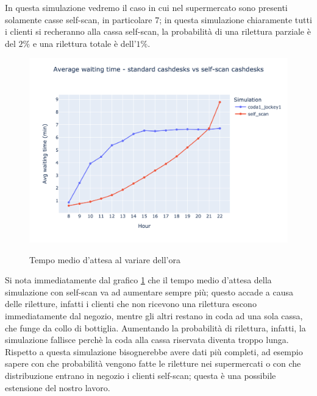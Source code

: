 In questa simulazione vedremo il caso in cui nel supermercato sono presenti solamente casse self-scan, in particolare 7; in questa simulazione chiaramente tutti i clienti si recheranno alla cassa self-scan, la probabilità di una rilettura parziale è del $2\%$ e una rilettura totale è dell'$1\%$.

\begin{figure}[H]
	\centering
	\includegraphics[width=12cm]{"images/results/avg_wt_selfscan.png"}
	\label{fig:avg_wt_selfscan}
	\caption{Tempo medio d'attesa al variare dell'ora}
\end{figure}

Si nota immediatamente dal grafico \ref{fig:avg_wt_selfscan} che il tempo medio d'attesa della simulazione con self-scan va ad aumentare sempre più; questo accade a causa delle riletture, infatti i clienti che non ricevono una rilettura escono immediatamente dal negozio, mentre gli altri restano in coda ad una sola cassa, che funge da collo di bottiglia. Aumentando la probabilità di rilettura, infatti, la simulazione fallisce perchè la coda alla cassa riservata diventa troppo lunga. \\
Rispetto a questa simulazione bisognerebbe avere dati più completi, ad esempio sapere con che probabilità vengono fatte le riletture nei supermercati o con che distribuzione entrano in negozio i clienti self-scan; questa è una possibile estensione del nostro lavoro.

